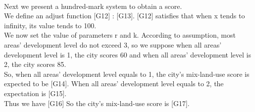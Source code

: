 \\
Next we present a hundred-mark system to obtain a score.
\\
We define an adjust function [G12] : [G13]. [G12] satisfies that when x tends to infinity, its value tends to 100.
\\
We now set the value of parameters r and k.
According to assumption, most areas' development level do not exceed 3, so we suppose when all areas' development level is 1, the city scores 60 and when all areas' development level is 2, the city scores 85.
\\
So, when all areas' development level equals to 1, the city's mix-land-use score is expected to be [G14].
When all areas' development level equals to 2, the expectation is [G15].
\\
Thus we have [G16]
So the city's mix-land-use score is [G17].
\\

